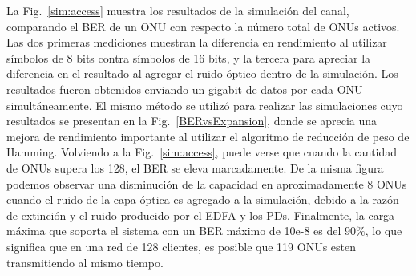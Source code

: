 La Fig.~\ref{sim:access} muestra los resultados de la simulación del canal, comparando el BER de un ONU con respecto la número total de ONUs activos. Las dos primeras mediciones muestran la diferencia en rendimiento al utilizar símbolos de 8 bits contra símbolos de 16 bits, y la tercera para apreciar la diferencia en el resultado al agregar el ruido óptico dentro de la simulación.
Los resultados fueron obtenidos enviando un gigabit de datos por cada ONU simultáneamente. El mismo método se utilizó para realizar las simulaciones cuyo resultados se presentan en la Fig.~\ref{BERvsExpansion}, donde se aprecia una mejora de rendimiento importante al utilizar el algoritmo de reducción de peso de Hamming.
Volviendo a la Fig.~\ref{sim:access}, puede verse que cuando la cantidad de ONUs supera los 128, el BER se eleva marcadamente.
De la misma figura podemos observar una disminución de la capacidad en aproximadamente $8$ ONUs cuando el ruido de la capa óptica es agregado a la simulación, debido a la razón de extinción y el ruido producido por el EDFA y los PDs.
Finalmente, la carga máxima que soporta el sistema con un BER máximo de 10e-8 es del $90\%$, lo que significa que en una red de 128 clientes, es posible que 119 ONUs esten transmitiendo al mismo tiempo.



